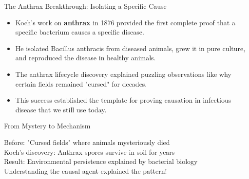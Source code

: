 \documentclass{beamer}
\begin{document}
	\begin{frame}{The Anthrax Breakthrough: Isolating a Specific Cause}
		\begin{itemize}
			\item Koch's work on \textbf{anthrax} in 1876 provided the first complete proof that a specific bacterium causes a specific disease.
			\item He isolated Bacillus anthracis from diseased animals, grew it in pure culture, and reproduced the disease in healthy animals.
			\item The anthrax lifecycle discovery explained puzzling observations like why certain fields remained "cursed" for decades.
			\item This success established the template for proving causation in infectious disease that we still use today.
		\end{itemize}
		
		\begin{block}{From Mystery to Mechanism}
			\begin{center}
				Before: "Cursed fields" where animals mysteriously died\\
				Koch's discovery: Anthrax spores survive in soil for years\\
				Result: Environmental persistence explained by bacterial biology\\
				\vspace{0.2cm}
				Understanding the causal agent explained the pattern!
			\end{center}
		\end{block}
	\end{frame}
	
\end{document}
